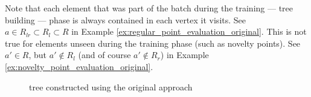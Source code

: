 Note that each element that was part of the batch during the training --- tree building --- phase is always contained in each vertex it visits. See $a \in R_{lr} \subset R_{l} \subset R$ in Example \ref{ex:regular_point_evaluation_original}.
This is not true for elements unseen during the training phase (such as novelty points).
See $a' \in R$, but $a' \notin R_l$ (and of course $a' \notin R_r$) in Example \ref{ex:novelty_point_evaluation_original}.

\begin{figure}[htbp]
\centering

\caption{tree constructed using the original approach}
\label{fig:example_noutlier_tree_color}
\end{figure}
